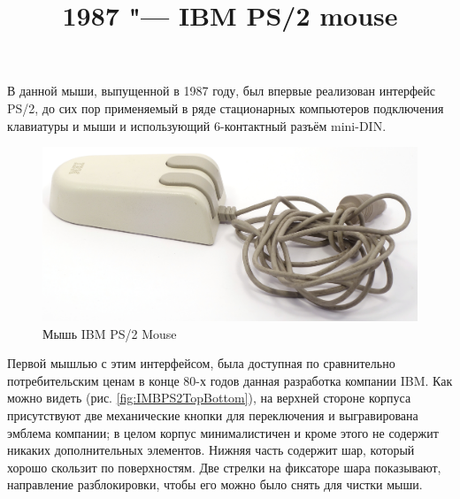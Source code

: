 \documentclass[11pt, a4paper]{article}
\begin{document}
\title{1987 "--- IBM PS/2 mouse}
\date{}
\maketitle

В данной мыши, выпущенной в 1987 году, был впервые реализован интерфейс PS/2, до сих пор применяемый в ряде стационарных компьютеров подключения клавиатуры и мыши и использующий 6-контактный разъём mini-DIN.

\begin{figure}[h]
    \centering
    \includegraphics[width=\textwidth]{1987_ibm_ps2_mouse/num0.JPG}
    \caption{Мышь IBM PS/2 Mouse}
    \label{fig:IMBPS2Pic}
\end{figure}

Первой мышлью с этим интерфейсом, была доступная по сравнительно потребительским ценам в конце 80-х годов данная разработка компании IBM. Как можно видеть (рис. \ref{fig:IMBPS2TopBottom}), на верхней стороне корпуса присутствуют две механические кнопки для переключения и выгравирована эмблема компании; в целом корпус минималистичен и кроме этого не содержит никаких дополнительных элементов. Нижняя часть содержит шар, который хорошо скользит по поверхностям. Две стрелки на фиксаторе шара показывают, направление разблокировки, чтобы его можно было снять для чистки мыши.
\end{document}
